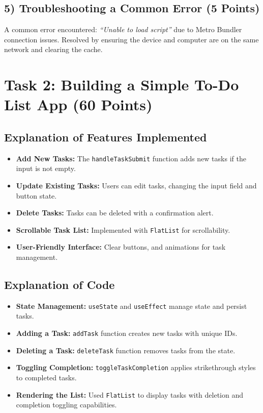 \documentclass{article}
\begin{document}
\subsection*{5) Troubleshooting a Common Error (5 Points)}
A common error encountered: \textit{“Unable to load script”} due to Metro Bundler connection issues. Resolved by ensuring the device and computer are on the same network and clearing the cache.

\section*{Task 2: Building a Simple To-Do List App (60 Points)}

\subsection*{Explanation of Features Implemented}
\begin{itemize}
    \item \textbf{Add New Tasks:} The \texttt{handleTaskSubmit} function adds new tasks if the input is not empty.
    \item \textbf{Update Existing Tasks:} Users can edit tasks, changing the input field and button state.
    \item \textbf{Delete Tasks:} Tasks can be deleted with a confirmation alert.
    \item \textbf{Scrollable Task List:} Implemented with \texttt{FlatList} for scrollability.
    \item \textbf{User-Friendly Interface:} Clear buttons, and animations for task management.
\end{itemize}

\subsection*{Explanation of Code}
\begin{itemize}
    \item \textbf{State Management:} \texttt{useState} and \texttt{useEffect} manage state and persist tasks.
    \item \textbf{Adding a Task:} \texttt{addTask} function creates new tasks with unique IDs.
    \item \textbf{Deleting a Task:} \texttt{deleteTask} function removes tasks from the state.
    \item \textbf{Toggling Completion:} \texttt{toggleTaskCompletion} applies strikethrough styles to completed tasks.
    \item \textbf{Rendering the List:} Used \texttt{FlatList} to display tasks with deletion and completion toggling capabilities.
\end{itemize}
\end{document}

